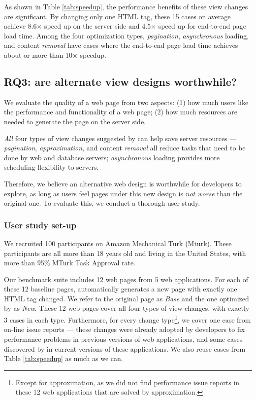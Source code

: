  

As shown in Table \ref{tab:speedup}, the performance benefits of 
these view changes are significant. 
By changing only one HTML tag, these 15 cases on average achieve 
8.6$\times$ speed up on the 
server side and 4.5$\times$ speed up for end-to-end page load time. 
Among the four optimization types, {\it pagination}, {\it asynchronous} loading,
and content {\it removal} have cases where the end-to-end page load
time achieves about or more than 10$\times$ speedup.



\subsection{RQ3: are alternate view designs worthwhile?}
\label{sec:rq3}
We evaluate the quality of a web page from two aspects:
(1) how much users like the performance 
and functionality of a web page;
(2) how much resources are needed to generate the page on the server side.

{\it All} four types of view changes suggested by \Tool can help save server
resources --- {\it pagination}, {\it approximation}, and content {\it removal} all reduce
tasks that need to be done by web and database servers; {\it asynchronous}
loading provides more scheduling flexibility to servers.

Therefore, we believe an alternative
web design is worthwhile for developers to explore, as long as users feel 
pages under this new design is {\it not worse} than the original one.
To evaluate this, we conduct a thorough user study.


\subsubsection{User study set-up}
We recruited 100 participants on Amazon Mechanical Turk (Mturk). 
These participants are all more than 18 years old and
living in the United States, with more than 95\% MTurk Task Approval rate. 

Our benchmark suite includes 12 web pages from 5 web applications. 
For each of these 12 baseline pages, \Tool automatically generates a new page
with exactly one HTML tag changed. We refer to the original page as {\it Base} and the
one optimized by \Tool as {\it New}. These 12 web pages 
cover all four types of view changes, with exactly 3 cases in each type. 
Furthermore,
for every change type\footnote{Except for approximation, as we did not find 
performance issue reports in these 12 web applications that are solved by approximation.}, 
we cover one case from on-line issue reports ---
these changes were already adopted by developers to fix performance problems in previous versions of 
web applications, and some cases discovered by \Tool in current versions of these applications.
We also reuse cases from Table \ref{tab:speedup} as
much as we can.

